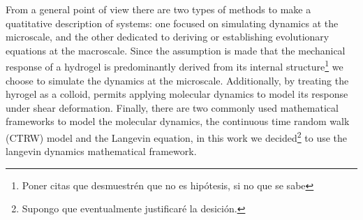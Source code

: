 From a general point of view there are two types of methods to make a quatitative description of systems: one focused on simulating dynamics at the microscale, and the other dedicated to deriving or establishing evolutionary equations at the macroscale\citep{wangMultiscaleModelingSimulation2025}.
Since the assumption is made that the mechanical response of a hydrogel is predominantly derived from its internal structure\footnote{Poner citas que desmuestrén que no es hipótesis, si no que se sabe} we choose to simulate the dynamics at the microscale.
Additionally, by treating the hyrogel as a colloid, permits applying molecular dynamics to model its response under shear deformation. 
Finally, there are two commonly used mathematical frameworks to model the molecular dynamics, the continuous time random walk (CTRW) model and the Langevin equation\citep{wangMultiscaleModelingSimulation2025}, in this work we decided\footnote{Supongo que eventualmente justificaré la desición.} to use the langevin dynamics mathematical framework.

